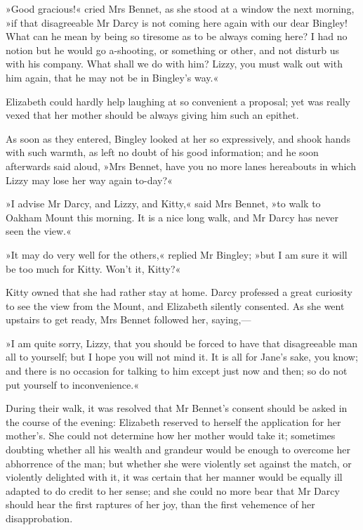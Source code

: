 »Good gracious!« cried Mrs Bennet, as she stood at a window the next morning, »if that disagreeable Mr Darcy is not coming here again with our dear Bingley! What can he mean by being so tiresome as to be always coming here? I had no notion but he would go a-shooting, or something or other, and not disturb us with his company. What shall we do with him? Lizzy, you must walk out with him again, that he may not be in Bingley's way.«

Elizabeth could hardly help laughing at so convenient a proposal; yet was really vexed that her mother should be always giving him such an epithet.

As soon as they entered, Bingley looked at her so expressively, and shook hands with such warmth, as left no doubt of his good information; and he soon afterwards said aloud, »Mrs Bennet, have you no more lanes hereabouts in which Lizzy may lose her way again to-day?«

»I advise Mr Darcy, and Lizzy, and Kitty,« said Mrs Bennet, »to walk to Oakham Mount this morning. It is a nice long walk, and Mr Darcy has never seen the view.«

»It may do very well for the others,« replied Mr Bingley; »but I am sure it will be too much for Kitty. Won't it, Kitty?«

Kitty owned that she had rather stay at home. Darcy professed a great curiosity to see the view from the Mount, and Elizabeth silently consented. As she went upstairs to get ready, Mrs Bennet followed her, saying,—

»I am quite sorry, Lizzy, that you should be forced to have that disagreeable man all to yourself; but I hope you will not mind it. It is all for Jane's sake, you know; and there is no occasion for talking to him except just now and then; so do not put yourself to inconvenience.«

During their walk, it was resolved that Mr Bennet's consent should be asked in the course of the evening: Elizabeth reserved to herself the application for her mother's. She could not determine how her mother would take it; sometimes doubting whether all his wealth and grandeur would be enough to overcome her abhorrence of the man; but whether she were violently set against the match, or violently delighted with it, it was certain that her manner would be equally ill adapted to do credit to her sense; and she could no more bear that Mr Darcy should hear the first raptures of her joy, than the first vehemence of her disapprobation.


